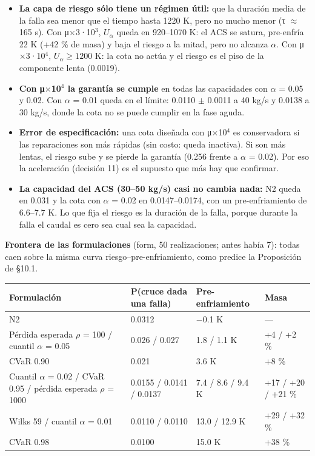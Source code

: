 \documentclass[11pt,a4paper]{article}
\newcommand{\codeus}{\textunderscore\allowbreak}
\newcommand{\code}[1]{{\small\ttfamily\let\_\codeus #1}}
\begin{document}
\begin{itemize}
\item \textbf{La capa de riesgo sólo tiene un régimen útil:} que la duración media de la falla sea menor que el tiempo hasta 1220 K, pero no mucho menor (τ $\approx$ 165 s). Con μ$\times$3·10$^{3}$, $U_\alpha$ queda en 920–1070 K: el ACS se satura, pre-enfría 22 K (+42 \% de masa) y baja el riesgo a la mitad, pero no alcanza $\alpha$. Con μ$\times$3·10$^{4}$, $U_\alpha\ge1200$ K: la cota no actúa y el riesgo es el piso de la componente lenta (0.0019).
\item \textbf{Con μ$\times$10$^{4}$ la garantía se cumple} en todas las capacidades con $\alpha$ = 0.05 y 0.02. Con $\alpha$ = 0.01 queda en el límite: 0.0110 $\pm$ 0.0011 a 40 kg/s y 0.0138 a 30 kg/s, donde la cota no se puede cumplir en la fase aguda.
\item \textbf{Error de especificación:} una cota diseñada con μ$\times$10$^{4}$ es conservadora si las reparaciones son más rápidas (sin costo: queda inactiva). Si son más lentas, el riesgo sube y se pierde la garantía (0.256 frente a $\alpha$ = 0.02). Por eso la aceleración (decisión 11) es el supuesto que más hay que confirmar.
\item \textbf{La capacidad del ACS (30–50 kg/s) casi no cambia nada:} N2 queda en 0.031 y la cota con $\alpha$ = 0.02 en 0.0147–0.0174, con un pre-enfriamiento de 6.6–7.7 K. Lo que fija el riesgo es la duración de la falla, porque durante la falla el caudal es cero sea cual sea la capacidad.
\end{itemize}

\textbf{Frontera de las formulaciones} (\code{form}, 50 realizaciones; antes había 7): todas caen sobre la misma curva riesgo–pre-enfriamiento, como predice la Proposición de \S{}10.1.

{\footnotesize
\begin{xltabular}{\linewidth}{@{}YYYY@{}}
\toprule
\textbf{Formulación} & \textbf{P(cruce dada una falla)} & \textbf{Pre-enfriamiento} & \textbf{Masa} \\
\midrule
\endhead
N2 & 0.0312 & $-$0.1 K & — \\
Pérdida esperada $\rho$ = 100 / cuantil $\alpha$ = 0.05 & 0.026 / 0.027 & 1.8 / 1.1 K & +4 / +2 \% \\
CVaR 0.90 & 0.021 & 3.6 K & +8 \% \\
Cuantil $\alpha$ = 0.02 / CVaR 0.95 / pérdida esperada $\rho$ = 1000 & 0.0155 / 0.0141 / 0.0137 & 7.4 / 8.6 / 9.4 K & +17 / +20 / +21 \% \\
Wilks 59 / cuantil $\alpha$ = 0.01 & 0.0110 / 0.0110 & 13.0 / 12.9 K & +29 / +32 \% \\
CVaR 0.98 & 0.0100 & 15.0 K & +38 \% \\
\bottomrule
\end{xltabular}}
\end{document}

